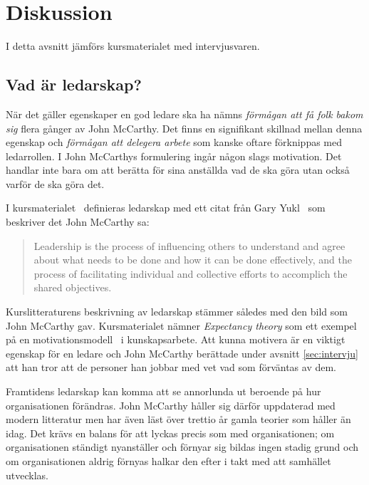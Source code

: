 \section{Diskussion}

I detta avsnitt jämförs kursmaterialet med intervjusvaren.

\subsection{Vad är ledarskap?}
När det gäller egenskaper en god ledare ska ha nämns \textit{förmågan att få folk bakom sig} flera gånger av John McCarthy. Det finns en signifikant skillnad mellan denna egenskap och \textit{förmågan att delegera arbete} som kanske oftare förknippas med ledarrollen. I John McCarthys formulering ingår någon slags motivation. Det handlar inte bara om att berätta för sina anställda vad de ska göra utan också varför de ska göra det.

I kursmaterialet~\citep{leadership} definieras ledarskap med ett citat från Gary Yukl~\citep{yukl} som beskriver det John McCarthy sa:
\begin{quote}
Leadership is the process of influencing others to understand 
and agree about what needs to be done and how it can be 
done effectively, and the process of facilitating individual and 
collective efforts to accomplich the shared objectives.
\end{quote}

Kurslitteraturens beskrivning av ledarskap stämmer således med den bild som John McCarthy gav. Kursmaterialet nämner \textit{Expectancy theory} som ett exempel på en motivationsmodell~\cite{motivation} i kunskapsarbete. Att kunna motivera är en viktigt egenskap för en ledare och John McCarthy berättade under avsnitt \ref{sec:intervju} att han tror att de personer han jobbar med vet vad som förväntas av dem.

Framtidens ledarskap kan komma att se annorlunda ut beroende på hur organisationen förändras. John McCarthy håller sig därför uppdaterad med modern litteratur men har även läst över trettio år gamla teorier som håller än idag. Det krävs en balans för att lyckas precis som med organisationen; om organisationen ständigt nyanställer och förnyar sig bildas ingen stadig grund och om organisationen aldrig förnyas halkar den efter i takt med att samhället utvecklas.

